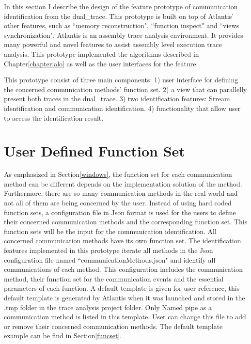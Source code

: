 

\label{chapter:newsol}
In this section I describe the design of the feature prototype of communication identification from the dual\_trace. This prototype is built on top of Atlantis' other features, such as ``memory reconstruction", ``function inspect" and ``views synchronization". Atlantis is an assembly trace analysis environment. It provides many powerful and novel features to assist assembly level execution trace analysis.\cite{huang2017atlantis} This prototype implemented the algorithms described in Chapter\ref{chapter:alo} as well as the user interfaces for the feature.

This prototype consist of three main components: 1) user interface for defining the concerned communication methods' function set. 2) a view that can parallelly present both traces in the dual\_trace. 3) two identification features: Stream identification and communication identification. 4) functionality that allow user to access the identification result.


\section{User Defined Function Set}
As emphasized in Section\ref{windows}, the function set for each communication method can be different depends on the implementation solution of the method. Furthermore, there are so many communication methods in the real world and not all of them are being concerned by the user. Instead of using hard coded function sets, a configuration file in Json format is used for the users to define their concerned communication methods and the corresponding function set. This function sets will be the input for the communication identification. All concerned communication methods have its own function set. The identification features implemented in this prototype iterate all methods in the Json configuration file named ``communicationMethods.json" and identify all communications of each method. This configuration includes the communication method, their function set for the communication events and the essential parameters of each function. A default template is given for user reference, this default template is generated by Atlantis when it was launched and stored in the .tmp folder in the trace analysis project folder. Only Named pipe as a communication method is listed in this template. User can change this file to add or remove their concerned communication methods. The default template example can be find in Section\ref{funcset}.

